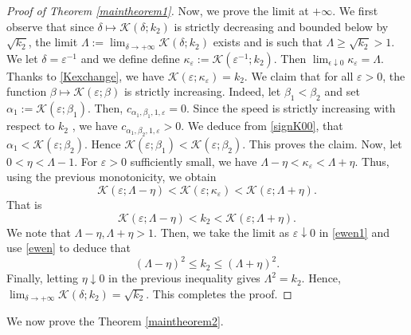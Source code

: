 \documentclass[11pt]{article}
\numberwithin{equation}{section}
\newcommand{\1}{\mathbbm{1}}
\numberwithin{equation}{section}
\theoremstyle{definition}
\def \dis {\displaystyle}
\def \K {\mathcal{K}}
\numberwithin{equation}{section}
\def \dis {\displaystyle}
\begin{document}
\begin{proof}[Proof of Theorem \ref{maintheorem1}]
Now, we prove the limit at $+\infty$.  We first observe that since 	$\delta\mapsto\K(\delta;k_2)$ is strictly decreasing and bounded below by $\sqrt{k_2}$, the limit $\Lambda:=\dis \lim_{\delta\to+\infty}\mathcal K(\delta;k_2)$ exists and is such that  $\Lambda\geq\sqrt{k_2}>1$.  We let $\delta=\varepsilon^{-1}$ and we define define $\kappa_\varepsilon:=\K(\varepsilon^{-1};k_2)$.  Then $\dis\lim_{\epsilon\downarrow0}\kappa_\varepsilon=\Lambda$. Thanks to  \eqref{Kexchange}, we have $\K(\varepsilon;\kappa_\varepsilon)=k_2$. We claim that for all $\varepsilon>0$, the function $\beta \mapsto\K(\varepsilon;\beta)$ is strictly increasing.  Indeed, let $\beta_1<\beta_2$ and set $\alpha_1:=\K(\varepsilon;\beta_1)$. Then, $c_{\alpha_1, \beta_1,1,\varepsilon}=0$. Since the speed is strictly increasing with respect to $k_2$ \cite{kan1995}, we have $c_{\alpha_1, \beta_2,1,\varepsilon}>0$. We deduce from \eqref{signK00}, that $\alpha_1<\K(\varepsilon;\beta_2)$. Hence $\K(\varepsilon;\beta_1)<\K(\varepsilon;\beta_2)$. This proves the claim. Now, let $0<\eta<\Lambda-1$. For $\varepsilon>0$ sufficiently small, we have $\Lambda-\eta<\kappa_\varepsilon<\Lambda+\eta$. Thus, using the previous monotonicity, we obtain 
\begin{equation*}
\K(\varepsilon;\Lambda-\eta)<\K(\varepsilon;\kappa_\varepsilon)<\K(\varepsilon;\Lambda+\eta).
\end{equation*}
That is 
\begin{equation}\label{ewen1}
	\K(\varepsilon;\Lambda-\eta)<k_2<\K(\varepsilon;\Lambda+\eta).
\end{equation}
We note that $\Lambda-\eta, \Lambda+\eta>1$. Then, we take the limit as $\varepsilon\downarrow 0$ in \eqref{ewen1} and use \eqref{ewen} to deduce that
\begin{equation*}
(\Lambda-\eta)^2\leq k_2\leq(\Lambda+\eta)^2. 
\end{equation*}
Finally, letting $\eta\downarrow0$ in the previous inequality gives $\Lambda^2=k_2$.  Hence, $	\dis \lim_{\delta\to+\infty}\K(\delta;k_2)=\sqrt{k_2}.$ This completes the proof.
\end{proof}

We now prove the Theorem \ref{maintheorem2}. 
	
\end{document}
